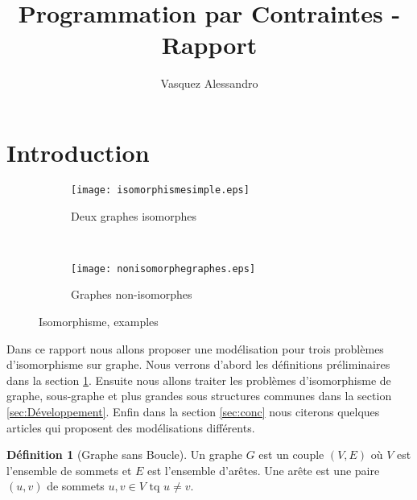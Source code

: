 \documentclass[french]{article}
\theoremstyle{definition}
\newtheorem{deff}{D\'efinition}[section]
\theoremstyle{remark}
\begin{document}
	\title{Programmation par Contraintes - Rapport}
	\author{Vasquez Alessandro}
	\maketitle
	\newpage
	\tableofcontents
	\newpage
\section{Introduction}
\label{sec:intro}
\begin{figure*}[t!]
	\begin{subfigure}[t]{0.5\textwidth}
		\centering
		\texttt{[image: isomorphismesimple.eps]}
		\caption{\label{fig:isographstar}Deux graphes isomorphes}
	\end{subfigure}%
	~ 
	\begin{subfigure}[t]{0.5\textwidth}
		\centering
		\texttt{[image: nonisomorphegraphes.eps]}
		\caption{\label{fig:nonisograph}Graphes  non-isomorphes}
	\end{subfigure}
	\caption{Isomorphisme, examples}
\end{figure*}
Dans ce rapport nous allons proposer une modélisation pour trois problèmes d'isomorphisme sur graphe. 
Nous verrons d'abord les définitions préliminaires dans la section \ref{sec:intro}. Ensuite nous allons traiter les problèmes d'isomorphisme de graphe, sous-graphe et plus grandes sous structures communes dans la section \ref{sec:Développement}. 
Enfin dans la section \ref{sec:conc} nous citerons quelques articles qui proposent des modélisations différents. 

\begin{deff}[Graphe sans Boucle]
	Un graphe $G$ est un couple $(V,E)$ où $V$ est l'ensemble de sommets et $E$ est l'ensemble d'arêtes. Une arête est une paire $(u,v)$ de sommets $u,v \in V \text{ tq } u \neq v.$
	
\end{deff}
\end{document}
